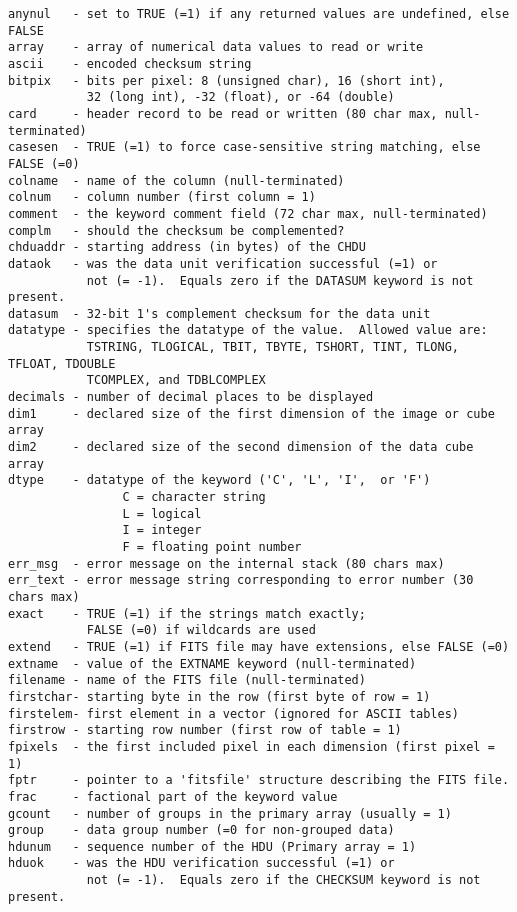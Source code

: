 \begin{verbatim}
anynul   - set to TRUE (=1) if any returned values are undefined, else FALSE
array    - array of numerical data values to read or write
ascii    - encoded checksum string
bitpix   - bits per pixel: 8 (unsigned char), 16 (short int),
           32 (long int), -32 (float), or -64 (double)
card     - header record to be read or written (80 char max, null-terminated)
casesen  - TRUE (=1) to force case-sensitive string matching, else FALSE (=0)
colname  - name of the column (null-terminated)
colnum   - column number (first column = 1)
comment  - the keyword comment field (72 char max, null-terminated)
complm   - should the checksum be complemented?
chduaddr - starting address (in bytes) of the CHDU
dataok   - was the data unit verification successful (=1) or
           not (= -1).  Equals zero if the DATASUM keyword is not present.
datasum  - 32-bit 1's complement checksum for the data unit
datatype - specifies the datatype of the value.  Allowed value are:
           TSTRING, TLOGICAL, TBIT, TBYTE, TSHORT, TINT, TLONG, TFLOAT, TDOUBLE
           TCOMPLEX, and TDBLCOMPLEX
decimals - number of decimal places to be displayed
dim1     - declared size of the first dimension of the image or cube array
dim2     - declared size of the second dimension of the data cube array
dtype    - datatype of the keyword ('C', 'L', 'I',  or 'F')
                C = character string
                L = logical
                I = integer
                F = floating point number
err_msg  - error message on the internal stack (80 chars max)
err_text - error message string corresponding to error number (30 chars max)
exact    - TRUE (=1) if the strings match exactly;
           FALSE (=0) if wildcards are used
extend   - TRUE (=1) if FITS file may have extensions, else FALSE (=0)
extname  - value of the EXTNAME keyword (null-terminated)
filename - name of the FITS file (null-terminated)
firstchar- starting byte in the row (first byte of row = 1)
firstelem- first element in a vector (ignored for ASCII tables)
firstrow - starting row number (first row of table = 1)
fpixels  - the first included pixel in each dimension (first pixel = 1)
fptr     - pointer to a 'fitsfile' structure describing the FITS file.
frac     - factional part of the keyword value
gcount   - number of groups in the primary array (usually = 1)
group    - data group number (=0 for non-grouped data)
hdunum   - sequence number of the HDU (Primary array = 1)
hduok    - was the HDU verification successful (=1) or
           not (= -1).  Equals zero if the CHECKSUM keyword is not present.

\end{verbatim}
